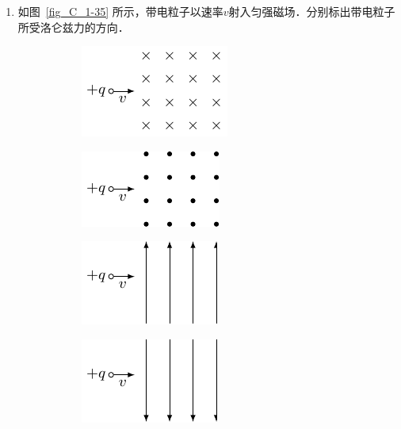 \begin{enumerate}
    \item 如图~\ref{fig_C_1-35} 所示，带电粒子以速率$v$射入匀强磁场．分别标出带电粒子所受洛仑兹力的方向．
    \begin{figure}[htbp]
        \centering
        \begin{subfigure}{0.23\linewidth}
            \centering
            \includegraphics{fig/C/1-35a.pdf}
            \caption{}\label{fig_C_1-35a}
        \end{subfigure}
        \hfil
        \begin{subfigure}{0.23\linewidth}
            \centering
            \includegraphics{fig/C/1-35b.pdf}
            \caption{}\label{fig_C_1-35b}
        \end{subfigure}
        \hfil
        \begin{subfigure}{0.23\linewidth}
            \centering
            \includegraphics{fig/C/1-35c.pdf}
            \caption{}\label{fig_C_1-35c}
        \end{subfigure}
        \hfil
        \begin{subfigure}{0.23\linewidth}
            \centering
            \includegraphics{fig/C/1-35d.pdf}
            \caption{}\label{fig_C_1-35d}
        \end{subfigure}

\end{figure}
\end{enumerate}

